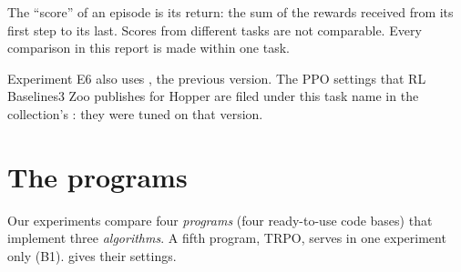 The \enquote{score} of an episode is its return: the sum of the rewards received from its first step to its
last. Scores from different tasks are not comparable. Every comparison in this report is made within one
task.

Experiment E6 also uses , the previous version. The PPO settings that RL Baselines3 Zoo
publishes for Hopper are filed under this task name in the collection's : they were
tuned on that version.

\section{The programs}\label{sec:programmes}

Our experiments compare four \emph{programs} (four ready-to-use code bases) that implement three
\emph{algorithms}. A fifth program, TRPO, serves in one experiment only (B1).  gives
their settings.

